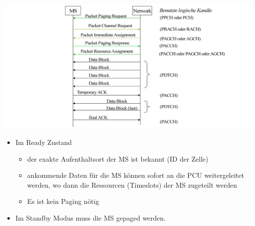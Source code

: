 \begin{minipage}{0.5 \linewidth}
\includegraphics[width = \linewidth]{./Pics/MSDatenverkehr2} \\

\begin{itemize}
\item Im Ready Zustand
\begin{itemize}
\item der exakte Aufenthaltsort der MS ist bekannt (ID der Zelle)
\item ankommende Daten für die MS können sofort an die PCU weitergeleitet werden, wo dann die Ressourcen (Timeslots) der MS zugeteilt werden
\item Es ist kein Paging nötig
\end{itemize}
\item Im Standby Modus muss die MS gepaged werden.
\end{itemize}
\end{minipage}

